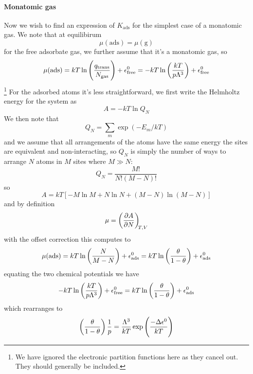 \paragraph{Monatomic gas}
Now we wish to find an expression of $K_{\text{ads}}$ for the simplest case of a monatomic gas. We note that at equilibirum
\begin{equation}
  \mu(\text{ads})=\mu(\text{g})
\end{equation}
for the free adsorbate gas, we further assume that it's a monatomic gas, so
\begin{equation}
  \mu(\text{ads})=kT\ln\left(\frac{q_{\text{trans}}}{N_{\text{gas}}} \right)+\epsilon^{0}_{\text{free}}=-kT\ln\left(\frac{kT}{p\Lambda^3} \right)+\epsilon^0_{\text{free}}
\end{equation}\footnote{We have ignored the electronic partition functions here as they cancel out. They should generally be included.}
For the adsorbed atoms it's less straightforward, we first write the Helmholtz energy for the system as
\begin{equation}
  A=-kT\ln Q_N
\end{equation}
We then note that 
\begin{equation}
  Q_N=\sum_m\exp(-E_m/kT)
\end{equation}
and we assume that all arrangements of the atoms have the same energy \ie the sites are equivalent and non-interacting, so $Q_N$ is simply the number of ways to arrange $N$ atoms in $M$ sites where $M\gg N$:
\begin{equation}
  Q_N=\frac{M!}{N!(M-N)!}
\end{equation}
so
\begin{equation}
  A=kT[-M\ln M+N\ln N+(M-N)\ln(M-N)]
\end{equation}
and by definition
\begin{equation}
  \mu=\diffp AN[T,V]
\end{equation}
with the offset correction this computes to
\begin{equation}
  \mu(\text{ads})=kT\ln\left(\frac{N}{M-N} \right)+\epsilon^0_{\text{ads}}=kT\ln\left(\frac{\theta}{1-\theta} \right)+\epsilon^0_{\text{ads}}
\end{equation}
equating the two chemical potentials we have
\begin{equation}
  -kT\ln\left(\frac{kT}{p\Lambda^3} \right)+\epsilon^0_{\text{free}}=kT\ln\left(\frac{\theta}{1-\theta} \right)+\epsilon^0_{\text{ads}}
\end{equation}
which rearranges to
\begin{equation}
  \left(\frac{\theta}{1-\theta} \right)\frac{1}{p}=\frac{\Lambda^3}{kT}\exp\left(\frac{-\Delta\epsilon^0}{kT} \right)
\end{equation}
